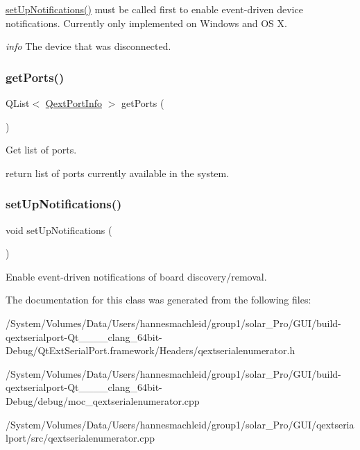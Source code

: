 \mbox{\hyperlink{class_qext_serial_enumerator_a8879197538e52cc9e4ad6a8902c50187}{set\+Up\+Notifications()}} must be called first to enable event-\/driven device notifications. Currently only implemented on Windows and OS X.

{\itshape info} The device that was disconnected. \mbox{\label{class_qext_serial_enumerator_a6d8b9a5aece0a1419ceeef96e4401f88}} 
\subsubsection{\texorpdfstring{getPorts()}{getPorts()}}
{\footnotesize\ttfamily Q\+List$<$ \mbox{\hyperlink{struct_qext_port_info}{Qext\+Port\+Info}} $>$ get\+Ports (\begin{DoxyParamCaption}{ }\end{DoxyParamCaption})\hspace{0.3cm}{\ttfamily [static]}}

Get list of ports.

return list of ports currently available in the system. \mbox{\label{class_qext_serial_enumerator_a8879197538e52cc9e4ad6a8902c50187}} 
\subsubsection{\texorpdfstring{setUpNotifications()}{setUpNotifications()}}
{\footnotesize\ttfamily void set\+Up\+Notifications (\begin{DoxyParamCaption}{ }\end{DoxyParamCaption})}

Enable event-\/driven notifications of board discovery/removal. 

The documentation for this class was generated from the following files\+:\begin{DoxyCompactItemize}
\item 
/\+System/\+Volumes/\+Data/\+Users/hannesmachleid/group1/solar\+\_\+\+Pro/\+G\+U\+I/build-\/qextserialport-\/\+Qt\+\_\+\_\+\_\+\_\+clang\+\_\+64bit-\/\+Debug/\+Qt\+Ext\+Serial\+Port.\+framework/\+Headers/qextserialenumerator.\+h\item 
/\+System/\+Volumes/\+Data/\+Users/hannesmachleid/group1/solar\+\_\+\+Pro/\+G\+U\+I/build-\/qextserialport-\/\+Qt\+\_\+\_\+\_\+\_\+clang\+\_\+64bit-\/\+Debug/debug/moc\+\_\+qextserialenumerator.\+cpp\item 
/\+System/\+Volumes/\+Data/\+Users/hannesmachleid/group1/solar\+\_\+\+Pro/\+G\+U\+I/qextserialport/src/qextserialenumerator.\+cpp\end{DoxyCompactItemize}
